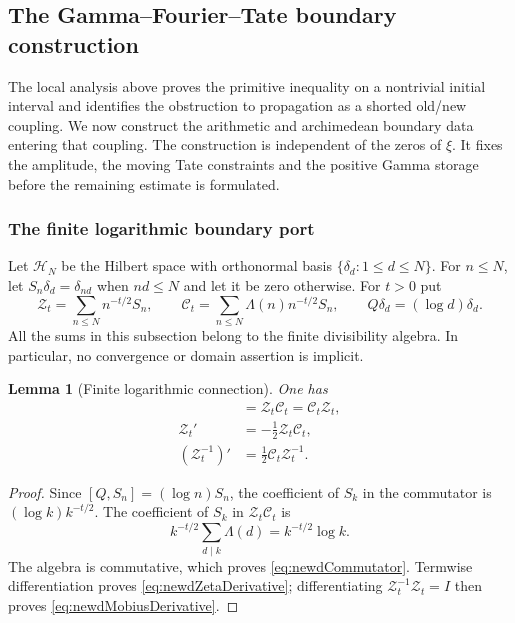 \documentclass[11pt]{amsart}
\newtheorem{lemma}[theorem]{Lemma}
\theoremstyle{definition}
\theoremstyle{remark}
\begin{document}
\subsection{The Gamma--Fourier--Tate boundary construction}
\label{ss:gammafouriertate}

The local analysis above proves the primitive inequality on a nontrivial
initial interval and identifies the obstruction to propagation as a shorted
old/new coupling.  We now construct the arithmetic and archimedean boundary
data entering that coupling.  The construction is independent of the zeros
of $\xi$.  It fixes the amplitude, the moving Tate constraints and the
positive Gamma storage before the remaining estimate is formulated.

\subsubsection{The finite logarithmic boundary port}

Let $\mathcal H_N$ be the Hilbert space with orthonormal basis
$\{\delta_d:1\leq d\leq N\}$.  For $n\leq N$, let
$S_n\delta_d=\delta_{nd}$ when $nd\leq N$ and let it be zero otherwise.
For $t>0$ put
\begin{equation}\label{eq:newdZetaConnection}
 \mathscr Z_t=\sum_{n\leq N}n^{-t/2}S_n,
 \qquad
 \mathscr C_t=\sum_{n\leq N}\Lambda(n)n^{-t/2}S_n,
 \qquad Q\delta_d=(\log d)\delta_d.
\end{equation}
All the sums in this subsection belong to the finite divisibility algebra.
In particular, no convergence or domain assertion is implicit.

\begin{lemma}[Finite logarithmic connection]
\label{lem:newdFiniteConnection}
One has
\begin{align}
 [Q,\mathscr Z_t]&=\mathscr Z_t\mathscr C_t
                  =\mathscr C_t\mathscr Z_t,
                  \label{eq:newdCommutator}\\
 \mathscr Z_t'&=-\tfrac12\mathscr Z_t\mathscr C_t,
                  \label{eq:newdZetaDerivative}\\
 (\mathscr Z_t^{-1})'&=\tfrac12\mathscr C_t\mathscr Z_t^{-1}.
                  \label{eq:newdMobiusDerivative}
\end{align}
\end{lemma}

\begin{proof}
Since $[Q,S_n]=(\log n)S_n$, the coefficient of $S_k$ in the
commutator is $(\log k)k^{-t/2}$.  The coefficient of $S_k$ in
$\mathscr Z_t\mathscr C_t$ is
\[
 k^{-t/2}\sum_{d\mid k}\Lambda(d)=k^{-t/2}\log k.
\]
The algebra is commutative, which proves \eqref{eq:newdCommutator}.
Termwise differentiation proves \eqref{eq:newdZetaDerivative};
differentiating $\mathscr Z_t^{-1}\mathscr Z_t=I$ then proves
\eqref{eq:newdMobiusDerivative}.
\end{proof}
\end{document}
